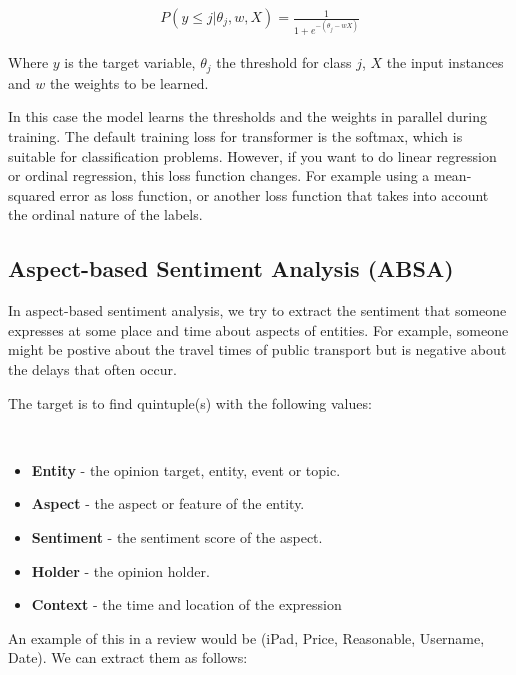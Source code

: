 \begin{definition}
  \begin{align*}
    P(y \leq j | \theta_j,w,X) = \frac{1}{1 + e^{-(\theta_j-wX)}}
  \end{align*}

  Where $y$ is the target variable, $\theta_j$ the threshold for class $j$,
  $X$ the input instances and $w$ the weights to be learned.
\end{definition}

In this case the model learns the thresholds and the weights in parallel
during training. The default training loss for transformer is the softmax,
which is suitable for classification problems. However, if you want to do
linear regression or ordinal regression, this loss function changes. For
example using a mean-squared error as loss function, or another loss function
that takes into account the ordinal nature of the labels.

\subsection{Aspect-based Sentiment Analysis (ABSA)}

In aspect-based sentiment analysis, we try to extract the sentiment that
someone expresses at some place and time about aspects of entities. For example,
someone might be postive about the travel times of public transport
but is negative
about the delays that often occur.

The target is to find quintuple(s) with the following values:

\begin{definition}
  ~
  \begin{itemize}
    \item \textbf{Entity} - the opinion target, entity, event or topic.
    \item \textbf{Aspect} - the aspect or feature of the entity.
    \item \textbf{Sentiment} - the sentiment score of the aspect.
    \item \textbf{Holder} - the opinion holder.
    \item \textbf{Context} - the time and location of the expression
  \end{itemize}
\end{definition}

An example of this in a review would be (iPad, Price, Reasonable,
Username, Date).
We can extract them as follows:

